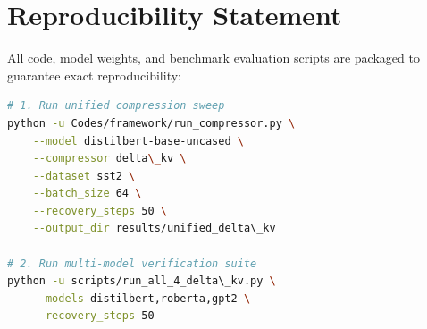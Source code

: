 \section{Reproducibility Statement}
All code, model weights, and benchmark evaluation scripts are packaged to guarantee exact reproducibility:
\begin{lstlisting}[language=bash]
# 1. Run unified compression sweep
python -u Codes/framework/run_compressor.py \
    --model distilbert-base-uncased \
    --compressor delta\_kv \
    --dataset sst2 \
    --batch_size 64 \
    --recovery_steps 50 \
    --output_dir results/unified_delta\_kv

# 2. Run multi-model verification suite
python -u scripts/run_all_4_delta\_kv.py \
    --models distilbert,roberta,gpt2 \
    --recovery_steps 50
\end{lstlisting}

